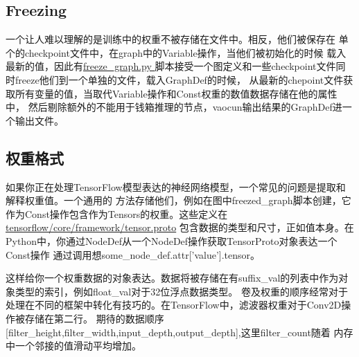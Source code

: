 \subsection{Freezing}
一个让人难以理解的是训练中的权重不被存储在文件中。相反，他们被保存在
单个的checkpoint文件中，在graph中的Variable操作，当他们被初始化的时候
载入最新的值，因此有\href{https://github.com/tensorflow/tensorflow/blob/master/tensorflow/python/tools/freeze_graph.py}{freeze\_graph.py }
脚本接受一个图定义和一些checkpoint文件同时freeze他们到一个单独的文件，载入GraphDef的时候，
从最新的chepoint文件获取所有变量的值，当取代Variable操作和Const权重的数值数据存储在他的属性中，
然后剔除额外的不能用于钱箱推理的节点，vaocun输出结果的GraphDef进一个输出文件。
\subsection{权重格式}
如果你正在处理TensorFlow模型表达的神经网络模型，一个常见的问题是提取和解释权重值。一个通用的
方法存储他们，例如在图中freezed\_graph脚本创建，它作为Const操作包含作为Tensors的权重。这些定义在
\href{https://github.com/tensorflow/tensorflow/blob/master/tensorflow/core/framework/tensor.proto}{tensorflow/core/framework/tensor.proto}
包含数据的类型和尺寸，正如值本身。在Python中，你通过NodeDef从一个NodeDef操作获取TensorProto对象表达一个Const操作
通过调用想some\_node\_def.attr['value'].tensor。

这样给你一个权重数据的对象表达。数据将被存储在有suffix\_val的列表中作为对象类型的索引，例如float\_val对于32位浮点数据类型。
卷及权重的顺序经常对于处理在不同的框架中转化有技巧的。在TensorFlow中，滤波器权重对于Conv2D操作被存储在第二行。
期待的数据顺序[filter\_height,filter\_width,input\_depth,output\_depth],这里filter\_count随着
内存中一个邻接的值滑动平均增加。
